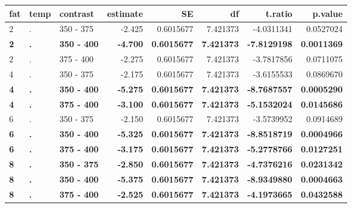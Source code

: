 \documentclass[12pt,]{article}
\begin{document}
\begin{table}[H]
\centering\begingroup\fontsize{8}{10}\selectfont

\begin{tabular}{l|l|l|r|r|r|r|r}
\hline
fat & temp & contrast & estimate & SE & df & t.ratio & p.value\\
\hline
2 & . & 350 - 375 & -2.425 & 0.6015677 & 7.421373 & -4.0311341 & 0.0527024\\
\hline
\rowcolor[HTML]{EAFAF1}  \textbf{2} & \textbf{.} & \textbf{350 - 400} & \textbf{-4.700} & \textbf{0.6015677} & \textbf{7.421373} & \textbf{-7.8129198} & \textbf{0.0011369}\\
\hline
2 & . & 375 - 400 & -2.275 & 0.6015677 & 7.421373 & -3.7817856 & 0.0711075\\
\hline
4 & . & 350 - 375 & -2.175 & 0.6015677 & 7.421373 & -3.6155533 & 0.0869670\\
\hline
\rowcolor[HTML]{EAFAF1}  \textbf{4} & \textbf{.} & \textbf{350 - 400} & \textbf{-5.275} & \textbf{0.6015677} & \textbf{7.421373} & \textbf{-8.7687557} & \textbf{0.0005290}\\
\hline
\rowcolor[HTML]{EAFAF1}  \textbf{4} & \textbf{.} & \textbf{375 - 400} & \textbf{-3.100} & \textbf{0.6015677} & \textbf{7.421373} & \textbf{-5.1532024} & \textbf{0.0145686}\\
\hline
6 & . & 350 - 375 & -2.150 & 0.6015677 & 7.421373 & -3.5739952 & 0.0914689\\
\hline
\rowcolor[HTML]{EAFAF1}  \textbf{6} & \textbf{.} & \textbf{350 - 400} & \textbf{-5.325} & \textbf{0.6015677} & \textbf{7.421373} & \textbf{-8.8518719} & \textbf{0.0004966}\\
\hline
\rowcolor[HTML]{EAFAF1}  \textbf{6} & \textbf{.} & \textbf{375 - 400} & \textbf{-3.175} & \textbf{0.6015677} & \textbf{7.421373} & \textbf{-5.2778766} & \textbf{0.0127251}\\
\hline
\rowcolor[HTML]{EAFAF1}  \textbf{8} & \textbf{.} & \textbf{350 - 375} & \textbf{-2.850} & \textbf{0.6015677} & \textbf{7.421373} & \textbf{-4.7376216} & \textbf{0.0231342}\\
\hline
\rowcolor[HTML]{EAFAF1}  \textbf{8} & \textbf{.} & \textbf{350 - 400} & \textbf{-5.375} & \textbf{0.6015677} & \textbf{7.421373} & \textbf{-8.9349880} & \textbf{0.0004663}\\
\hline
\rowcolor[HTML]{EAFAF1}  \textbf{8} & \textbf{.} & \textbf{375 - 400} & \textbf{-2.525} & \textbf{0.6015677} & \textbf{7.421373} & \textbf{-4.1973665} & \textbf{0.0432588}\\
\hline

\end{tabular}
\end{table}
\end{document}

